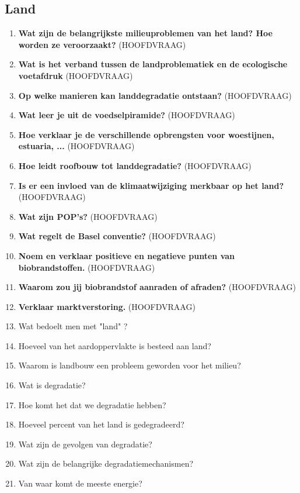 \documentclass[12pt]{article}
\begin{document}
    \subsection{Land}
    \begin{enumerate}
        \item \textbf{Wat zijn de belangrijkste milieuproblemen van het land? Hoe worden ze veroorzaakt?} (HOOFDVRAAG)
        \item \textbf{Wat is het verband tussen de landproblematiek en de ecologische voetafdruk} (HOOFDVRAAG)
        \item \textbf{Op welke manieren kan landdegradatie ontstaan?} (HOOFDVRAAG)
        \item \textbf{Wat leer je uit de voedselpiramide?} (HOOFDVRAAG)
        \item \textbf{Hoe verklaar je de verschillende opbrengsten voor woestijnen, estuaria, ...} (HOOFDVRAAG)
        \item \textbf{Hoe leidt roofbouw tot landdegradatie?} (HOOFDVRAAG)
        \item \textbf{Is er een invloed van de klimaatwijziging merkbaar op het land?} (HOOFDVRAAG)
        \item \textbf{Wat zijn POP's?} (HOOFDVRAAG)
        \item \textbf{Wat regelt de Basel conventie?} (HOOFDVRAAG)
        \item \textbf{Noem en verklaar positieve en negatieve punten van biobrandstoffen.} (HOOFDVRAAG)
        \item \textbf{Waarom zou jij biobrandstof aanraden of afraden?} (HOOFDVRAAG)
        \item \textbf{Verklaar marktverstoring.} (HOOFDVRAAG)
        \item Wat bedoelt men met "land" ?
        \item Hoeveel van het aardoppervlakte is besteed aan land? 
        \item Waarom is landbouw een probleem geworden voor het milieu?
        \item Wat is degradatie?
        \item Hoe komt het dat we degradatie hebben?
        \item Hoeveel percent van het land is gedegradeerd?
        \item Wat zijn de gevolgen van degradatie?
        \item Wat zijn de belangrijke degradatiemechanismen?
        \item Van waar komt de meeste energie?

\end{enumerate}
\end{document}
